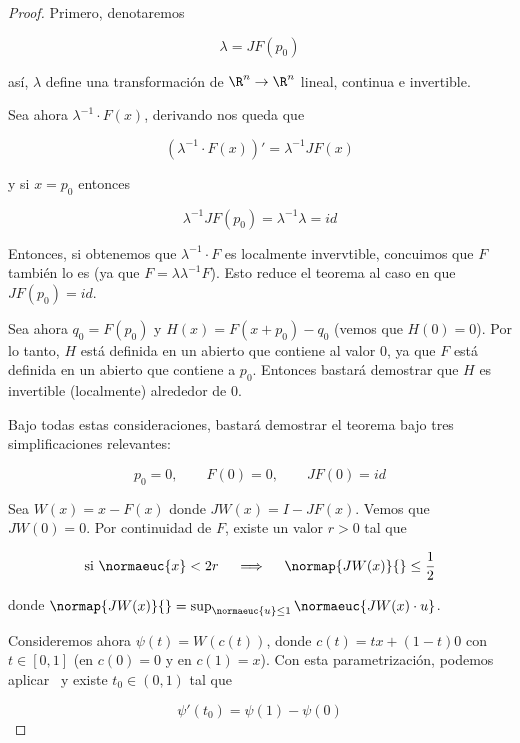 \begin{proof}
    Primero, denotaremos
    
    \[
    \lambda = JF(p_0)
    \]
    
    \noindent así, $\lambda$ define una transformación de $\R^n \rightarrow \R^n$ lineal, continua e invertible. 
    
    Sea ahora $\lambda^{-1} \cdot F(x)$, derivando nos queda que
    
    \[
    \left( \lambda^{-1} \cdot F(x) \right)' = \lambda^{-1}JF(x)
    \]
    
    \noindent y si $x = p_0$ entonces
    
    \[
    \lambda^{-1}JF(p_0) = \lambda^{-1}\lambda = id
    \]
    
    Entonces, si obtenemos que $\lambda^{-1} \cdot F$ es localmente invervtible, concuimos que $F$ también lo es (ya que $F = \lambda\lambda^{-1}F$). Esto reduce el teorema al caso en que $JF(p_0) = id$.
    
    Sea ahora $q_0 = F(p_0)$ y $H(x) = F(x + p_0) - q_0$ (vemos que $H(0) = 0$). Por lo tanto, $H$ está definida en un abierto que contiene al valor $0$, ya que $F$ está definida en un abierto que contiene a $p_0$. Entonces bastará demostrar que $H$ es invertible (localmente) alrededor de $0$.
    
    Bajo todas estas consideraciones, bastará demostrar el teorema bajo tres simplificaciones relevantes:
    
    \[
    p_0 = 0, \qquad F(0) = 0, \qquad JF(0) = id
    \]
    
    Sea $W(x) = x - F(x)$ donde $JW(x) = I - JF(x)$. Vemos que $JW(0) = 0$. Por continuidad de $F$, existe un valor $r > 0$ tal que
    
    \begin{equation}\label{eq:5.1.1}
        \text{si $\normaeuc{x} < 2r$} \quad \implies \quad \normap{JW(x)}{} \leq \frac{1}{2}
    \end{equation}
    
    \noindent donde $\normap{JW(x)}{} = \sup_{\normaeuc{u} \leq 1} \normaeuc{JW(x) \cdot u}$.
    
    Consideremos ahora $\psi(t) = W(c(t))$, donde $c(t) = tx + (1-t)0$ con $t \in [0,1]$ (en $c(0) = 0$ y en $c(1) = x$). Con esta parametrización, podemos aplicar \TVM~y existe $t_0 \in (0,1)$ tal que
    
    \begin{equation}\label{eq:5.1.2}
        \psi'(t_0) = \psi(1) - \psi(0)
    \end{equation}
    

\end{proof}
